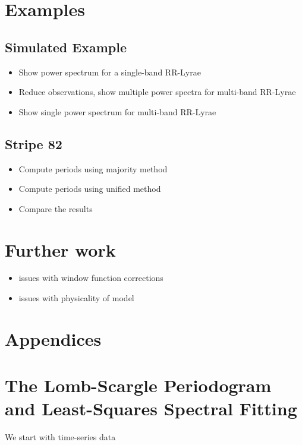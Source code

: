 \documentclass[12pt,preprint]{aastex}
\begin{document}
\section{Examples}
\subsection{Simulated Example}

\begin{itemize}
  \item Show power spectrum for a single-band RR-Lyrae
  \item Reduce observations, show multiple power spectra for multi-band RR-Lyrae
  \item Show single power spectrum for multi-band RR-Lyrae
\end{itemize}

\subsection{Stripe 82}

\begin{itemize}
  \item Compute periods using majority method
  \item Compute periods using unified method
  \item Compare the results
\end{itemize}

\section{Further work}

\begin{itemize}
  \item issues with window function corrections
  \item issues with physicality of model
\end{itemize}

\section{Appendices}

\appendix


\section{The Lomb-Scargle Periodogram and Least-Squares Spectral Fitting}

We start with time-series data
\end{document}
